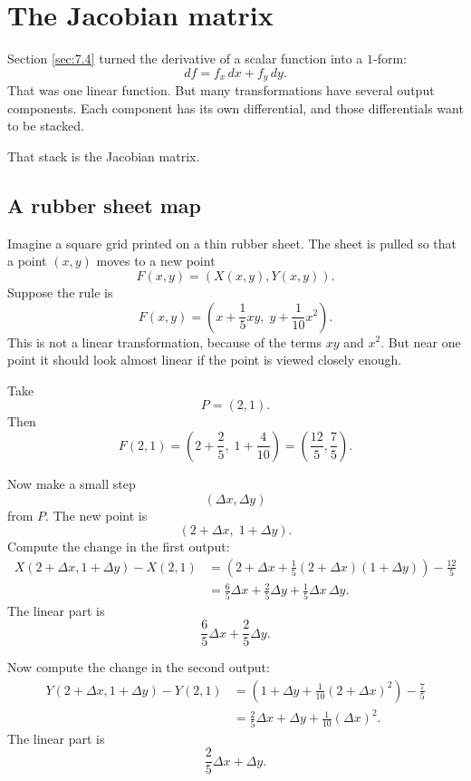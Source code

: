 \section{The Jacobian matrix}
\label{sec:7.5}

Section \ref{sec:7.4} turned the derivative of a scalar function into a \(1\)-form:
\[
    df=f_x\,dx+f_y\,dy.
\]
That was one linear function.  But many transformations have several output
components.  Each component has its own differential, and those differentials want to
be stacked.

That stack is the Jacobian matrix.

\subsection{A rubber sheet map}

Imagine a square grid printed on a thin rubber sheet.  The sheet is pulled so that a
point \((x,y)\) moves to a new point
\[
    F(x,y)=(X(x,y),Y(x,y)).
\]
Suppose the rule is
\[
\boxed{
    F(x,y)=
    \left(
        x+\frac15xy,\;
        y+\frac1{10}x^2
    \right).
}
\]
This is not a linear transformation, because of the terms \(xy\) and \(x^2\).  But near
one point it should look almost linear if the point is viewed closely enough.

Take
\[
    P=(2,1).
\]
Then
\[
    F(2,1)=
    \left(
        2+\frac25,\;
        1+\frac4{10}
    \right)
    =
    \left(\frac{12}{5},\frac75\right).
\]

Now make a small step
\[
    (\Delta x,\Delta y)
\]
from \(P\).  The new point is
\[
    (2+\Delta x,\;1+\Delta y).
\]
Compute the change in the first output:
\[
\begin{aligned}
X(2+\Delta x,1+\Delta y)-X(2,1)
&=
\left(2+\Delta x+\frac15(2+\Delta x)(1+\Delta y)\right)-\frac{12}{5}\\
&=
\frac65\Delta x+\frac25\Delta y+\frac15\Delta x\,\Delta y.
\end{aligned}
\]
The linear part is
\[
    \frac65\Delta x+\frac25\Delta y.
\]

Now compute the change in the second output:
\[
\begin{aligned}
Y(2+\Delta x,1+\Delta y)-Y(2,1)
&=
\left(1+\Delta y+\frac1{10}(2+\Delta x)^2\right)-\frac75\\
&=
\frac25\Delta x+\Delta y+\frac1{10}(\Delta x)^2.
\end{aligned}
\]
The linear part is
\[
    \frac25\Delta x+\Delta y.
\]

